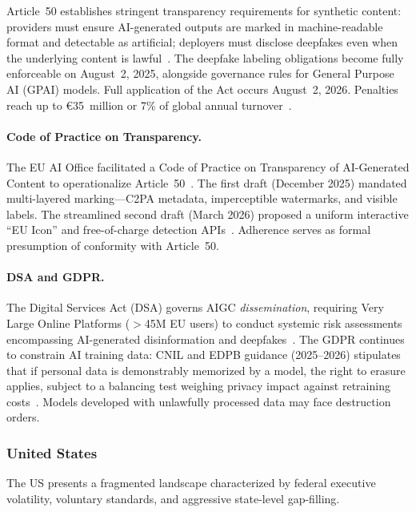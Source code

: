 Article~50 establishes stringent transparency requirements for synthetic content: providers must ensure AI-generated outputs are marked in machine-readable format and detectable as artificial; deployers must disclose deepfakes even when the underlying content is lawful~\cite{euaiact_art50}. The deepfake labeling obligations become fully enforceable on August~2, 2025, alongside governance rules for General Purpose AI (GPAI) models. Full application of the Act occurs August~2, 2026. Penalties reach up to \euro35~million or 7\% of global annual turnover~\cite{euaiact2024}.

\paragraph{Code of Practice on Transparency.}
The EU AI Office facilitated a Code of Practice on Transparency of AI-Generated Content to operationalize Article~50~\cite{eucode2025}. The first draft (December 2025) mandated multi-layered marking---C2PA metadata, imperceptible watermarks, and visible labels. The streamlined second draft (March 2026) proposed a uniform interactive ``EU Icon'' and free-of-charge detection APIs~\cite{eucode2026draft2}. Adherence serves as formal presumption of conformity with Article~50.

\paragraph{DSA and GDPR.}
The Digital Services Act (DSA) governs AIGC \emph{dissemination}, requiring Very Large Online Platforms ($>$45M EU users) to conduct systemic risk assessments encompassing AI-generated disinformation and deepfakes~\cite{dsa2024}. The GDPR continues to constrain AI training data: CNIL and EDPB guidance (2025--2026) stipulates that if personal data is demonstrably memorized by a model, the right to erasure applies, subject to a balancing test weighing privacy impact against retraining costs~\cite{cnil2025,edpb2024}. Models developed with unlawfully processed data may face destruction orders.


\subsubsection{United States}
\label{sec:gov-us}

The US presents a fragmented landscape characterized by federal executive volatility, voluntary standards, and aggressive state-level gap-filling.

